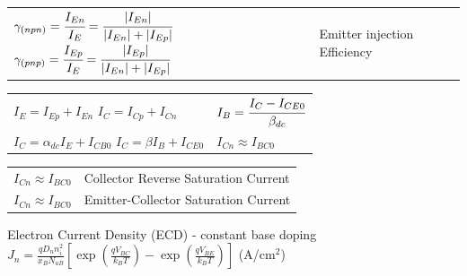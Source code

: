 \begin{multicols}{3}
\begin{tabular}{p{5cm}p{3.8cm}}
$\gamma_{(npn)}= \cfrac{I_{En}}{I_E}= \cfrac{|I_{En}|}{|I_{En}|+|I_{Ep}|}$  \hfill \break $\gamma_{(pnp)}= \cfrac{I_{Ep}}{I_E}= \cfrac{|I_{Ep}|}{|I_{En}|+|I_{Ep}|}$ & \hfill \break  Emitter injection \hfill \break  Efficiency \\
\end{tabular}

\begin{tabular}{l l}
$I_E=I_{Ep}+I_{En}$ $I_C = I_{Cp}+I_{Cn}$ & $I_B = \cfrac{I_C-I_{CE0}}{\beta_{dc}}$ \\
$I_C = \alpha_{dc}I_E+I_{CB0}$ $I_C=\beta I_B+I_{CE0}$ & $I_{Cn} \approx I_{BC0}$ \\
\end{tabular}

\begin{tabular}{p{5cm}p{3.8cm}}
$I_{Cn} \approx I_{BC0}$ & Collector Reverse  \hfill \break Saturation Current \\
$I_{Cn} \approx I_{BC0}$ & Emitter-Collector \hfill \break Saturation Current \\
\end{tabular}

Electron Current Density (ECD) - constant base doping \hfill \break 
$J_n= \frac{qD_n n_i^2}{x_B N_{aB}}\left[\exp\left(\frac{qV_{BC}}{k_BT}\right)-\exp\left(\frac{qV_{BE}}{k_BT}\right)\right]$  (A/$\text{cm}^2$)


\end{multicols}
